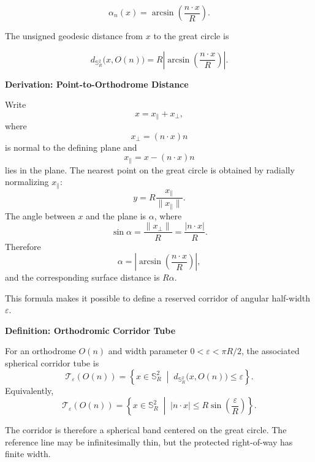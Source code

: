 \documentclass[11pt,fleqn]{book}
\numberwithin{equation}{chapter}
\newenvironment{definition}[1]
  {\begin{definitionEnv}
   \noindent\textbf{Definition: #1}\par\smallskip}
  {\end{definitionEnv}}
\newenvironment{derivation}[1]
  {\begin{derivationEnv}
   \noindent\textbf{Derivation: #1}\par\smallskip}
  {\end{derivationEnv}}
\theoremstyle{plain}
\theoremstyle{definition}
\theoremstyle{remark}
\newcommand{\Sphere}{\mathbb{S}^{2}}
\newcommand{\suchthat}{\;\middle|\;}
\begin{document}
\begin{equation}
    \alpha_n(x)
    =
    \arcsin\left(
      \frac{n\cdot x}{R}
    \right).
\end{equation}

The unsigned geodesic distance from \(x\) to the great circle is

\begin{equation}
    d_{\Sphere_R}\bigl(x,O(n)\bigr)
    =
    R
    \left|
    \arcsin\left(
      \frac{n\cdot x}{R}
    \right)
    \right|.
\end{equation}

\begin{derivation}{Point-to-Orthodrome Distance}
Write
\[
x=x_{\parallel}+x_{\perp},
\]
where
\[
x_{\perp}=(n\cdot x)n
\]
is normal to the defining plane and
\[
x_{\parallel}=x-(n\cdot x)n
\]
lies in the plane. The nearest point on the great circle is obtained by radially normalizing \(x_{\parallel}\):
\[
y
=
R\frac{x_{\parallel}}{\|x_{\parallel}\|}.
\]
The angle between \(x\) and the plane is \(\alpha\), where
\[
\sin\alpha
=
\frac{\|x_{\perp}\|}{R}
=
\frac{|n\cdot x|}{R}.
\]
Therefore
\[
\alpha
=
\left|
\arcsin\left(\frac{n\cdot x}{R}\right)
\right|,
\]
and the corresponding surface distance is \(R\alpha\).
\end{derivation}

This formula makes it possible to define a reserved corridor of angular half-width \(\varepsilon\).

\begin{definition}{Orthodromic Corridor Tube}
For an orthodrome \(O(n)\) and width parameter \(0<\varepsilon<\pi R/2\), the associated spherical corridor tube is
\[
\mathcal{T}_{\varepsilon}(O(n))
=
\left\{
x\in\Sphere_R
\suchthat
d_{\Sphere_R}\bigl(x,O(n)\bigr)
\leq\varepsilon
\right\}.
\]
Equivalently,
\[
\mathcal{T}_{\varepsilon}(O(n))
=
\left\{
x\in\Sphere_R
\suchthat
|n\cdot x|
\leq
R\sin\left(\frac{\varepsilon}{R}\right)
\right\}.
\]
\end{definition}

The corridor is therefore a spherical band centered on the great circle. The reference line may be infinitesimally thin, but the protected right-of-way has finite width.
\end{document}
